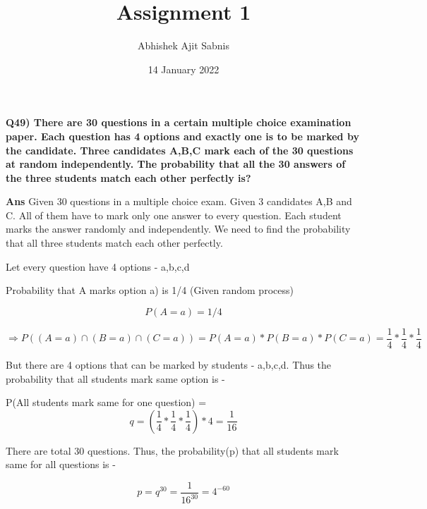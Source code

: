 \documentclass{article}
\title{\textbf{Assignment 1}}
\author{Abhishek Ajit Sabnis}
\date{14 January 2022}
\begin{document}
\maketitle

\textbf{Q49) There are 30 questions in a certain multiple choice examination paper. Each question has 4 options and exactly one is to be marked by the candidate. Three candidates A,B,C mark each of the 30 questions at random independently. The probability that all the 30 answers of the three students match each other perfectly is?}

\vspace{1cm}

\textbf{Ans}  Given 30 questions in a multiple choice exam. Given 3 candidates A,B and C. All of them have to mark only one answer to every question. Each student marks the answer randomly and independently. We need to find the probability that all three students match each other perfectly.

Let every question have 4 options - a,b,c,d
\vspace{0.5cm}

Probability that A marks option a) is 1/4 (Given random process)

\begin{equation}
    P(A=a) = 1/4
\end{equation}

\begin{equation}
    \Rightarrow P((A=a) \cap (B=a) \cap (C=a)) = P(A=a) * P(B=a) * P(C=a)  
 = \frac{1}{4} * \frac{1}{4} * \frac{1}{4}
\end{equation}

But there are 4 options that can be marked by students - a,b,c,d. Thus the probability that all students mark same option is - 
\vspace{0.5cm}

P(All students mark same for one question) = 
\begin{equation}
    q = (\frac{1}{4} * \frac{1}{4} * \frac{1}{4}) *4 = \frac{1}{16}
\end{equation}

There are total 30 questions. Thus, the probability(p) that all students mark same for all questions is - 

\begin{equation}
     p = q^{30} = \frac{1}{16^{30}} = 4^{-60}
\end{equation}
\end{document}
